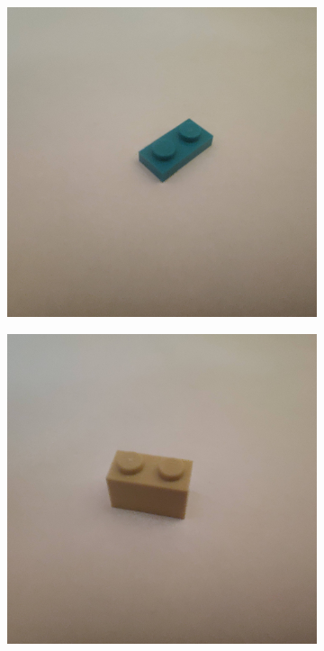 \documentclass[]{article}
\begin{document}
\begin{figure}[h]
\begin{subfigure}[b]{0.2\textwidth}
    \end{subfigure}
    \begin{subfigure}[b]{0.2\textwidth}
        \includegraphics[width=\textwidth]{photographed images/3.jpg}
    \end{subfigure}
    \begin{subfigure}[b]{0.2\textwidth}
        \includegraphics[width=\textwidth]{photographed images/4.jpg}

\end{subfigure}
\end{figure}
\end{document}
